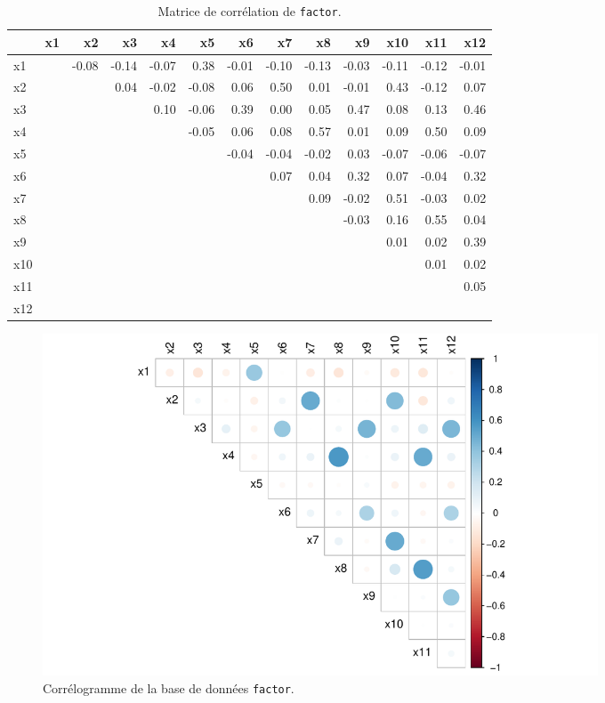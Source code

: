 \documentclass[
  11pt,
  letterpaper,
]{scrbook}
\theoremstyle{definition}
\theoremstyle{remark}
\begin{document}
\hypertarget{tbl-corrmat}{}
\begin{table}
\caption{\label{tbl-corrmat}Matrice de corrélation de \texttt{factor}. }\tabularnewline

\centering
\begin{tabular}{lrrrrrrrrrrrr}
\toprule
  & x1 & x2 & x3 & x4 & x5 & x6 & x7 & x8 & x9 & x10 & x11 & x12\\
\midrule
x1 &  & -0.08 & -0.14 & -0.07 & 0.38 & -0.01 & -0.10 & -0.13 & -0.03 & -0.11 & -0.12 & -0.01\\
x2 &  &  & 0.04 & -0.02 & -0.08 & 0.06 & 0.50 & 0.01 & -0.01 & 0.43 & -0.12 & 0.07\\
x3 &  &  &  & 0.10 & -0.06 & 0.39 & 0.00 & 0.05 & 0.47 & 0.08 & 0.13 & 0.46\\
x4 &  &  &  &  & -0.05 & 0.06 & 0.08 & 0.57 & 0.01 & 0.09 & 0.50 & 0.09\\
x5 &  &  &  &  &  & -0.04 & -0.04 & -0.02 & 0.03 & -0.07 & -0.06 & -0.07\\
\addlinespace
x6 &  &  &  &  &  &  & 0.07 & 0.04 & 0.32 & 0.07 & -0.04 & 0.32\\
x7 &  &  &  &  &  &  &  & 0.09 & -0.02 & 0.51 & -0.03 & 0.02\\
x8 &  &  &  &  &  &  &  &  & -0.03 & 0.16 & 0.55 & 0.04\\
x9 &  &  &  &  &  &  &  &  &  & 0.01 & 0.02 & 0.39\\
x10 &  &  &  &  &  &  &  &  &  &  & 0.01 & 0.02\\
\addlinespace
x11 &  &  &  &  &  &  &  &  &  &  &  & 0.05\\
x12 &  &  &  &  &  &  &  &  &  &  &  & \\
\bottomrule
\end{tabular}
\end{table}

\begin{figure}[ht!]

{\centering \includegraphics[width=0.8\textwidth,height=\textheight]{analysefactorielle_files/figure-pdf/fig-corrmat-1.pdf}

}

\caption{\label{fig-corrmat}Corrélogramme de la base de données
\texttt{factor}.}

\end{figure}
\end{document}
